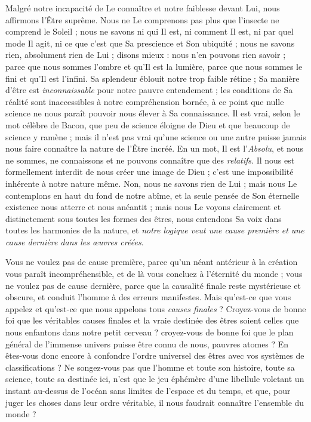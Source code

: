 \documentclass[a4paper, 11pt, oneside]{article}
\begin{document}
Malgré notre incapacité de Le connaître et notre faiblesse devant Lui, nous affirmons l'Être suprême. Nous ne Le comprenons pas plus que l'insecte ne comprend le Soleil ; nous ne savons ni qui Il est, ni comment Il est, ni par quel mode Il agit, ni ce que c'est que Sa prescience et Son ubiquité ; nous ne savons rien, absolument rien de Lui ; disons mieux : nous n'en pouvons rien savoir ; parce que nous sommes l'ombre et qu'Il est la lumière, parce que nous sommes le fini et qu'Il est l'infini. Sa splendeur éblouit notre trop faible rétine ; Sa manière d'être est \emph{inconnaissable} pour notre pauvre entendement ; les conditions de Sa réalité sont inaccessibles à notre compréhension bornée, à ce point que nulle science ne nous paraît pouvoir nous élever à Sa connaissance. Il est vrai, selon le mot célèbre de Bacon, que peu de science éloigne de Dieu et que beaucoup de science y ramène ; mais il n'est pas vrai qu'une science ou une autre puisse jamais nous faire connaître la nature de l'Être incréé. En un mot, Il est l'\emph{Absolu}, et nous ne sommes, ne connaissons et ne pouvons connaître que des \emph{relatifs}. Il nous est formellement interdit de nous créer une image de Dieu ; c'est une impossibilité inhérente à notre nature même. Non, nous ne savons rien de Lui ; mais nous Le contemplons en haut du fond de notre abîme, et la seule pensée de Son éternelle existence nous atterre et nous anéantit ; mais nous Le voyons clairement et distinctement sous toutes les formes des êtres, nous entendons Sa voix dans toutes les harmonies de la nature, et \emph{notre logique veut une cause première et une cause dernière dans les œuvres créées}.

Vous ne voulez pas de cause première, parce qu'un néant antérieur à la création vous paraît incompréhensible, et de là vous concluez à l'éternité du monde ; vous ne voulez pas de cause dernière, parce que la causalité finale reste mystérieuse et obscure, et conduit l'homme à des erreurs manifestes. Mais qu'est-ce que vous appelez et qu'est-ce que nous appelons tous \emph{causes finales} ? Croyez-vous de bonne foi que les véritables causes finales et la vraie destinée des êtres soient celles que nous enfantons dans notre petit cerveau ? croyez-vous de bonne foi que le plan général de l'immense univers puisse être connu de nous, pauvres atomes ? En êtes-vous donc encore à confondre l'ordre universel des êtres avec vos systèmes de classifications ? Ne songez-vous pas que l'homme et toute son histoire, toute sa science, toute sa destinée ici, n'est que le jeu éphémère d'une libellule voletant un instant au-dessus de l'océan sans limites de l'espace et du temps, et que, pour juger les choses dans leur ordre véritable, il nous faudrait connaître l'ensemble du monde ?
\end{document}
